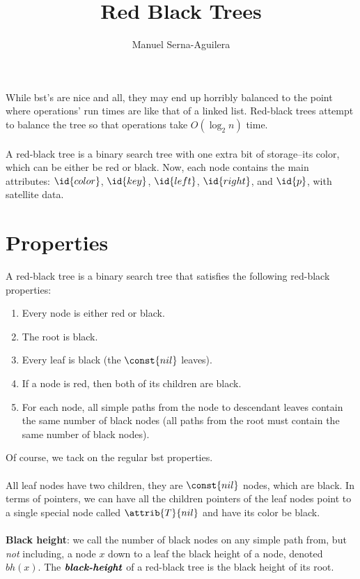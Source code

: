 \documentclass{article}
\title{Red Black Trees}
\author{Manuel Serna-Aguilera}
\date{}
\begin{document}
\maketitle

While bst's are nice and all, they may end up horribly balanced to the point where operations' run times are like that of a linked list. Red-black trees attempt to balance the tree so that operations take $O(\log_2{n})$ time.
\\ \\
A red-black tree is a binary search tree with one extra bit of storage--its color, which can be either be red or black. Now, each node contains the main attributes: $\id{color}$, $\id{key}$, $\id{left}$, $\id{right}$, and $\id{p}$, with satellite data.

\section*{Properties}
A red-black tree is a binary search tree that satisfies the following red-black properties:
\begin{enumerate}
    \item Every node is either red or black.
    \item The root is black.
    \item Every leaf is black (the $\const{nil}$ leaves).
    \item If a node is red, then both of its children are black.
    \item For each node, all simple paths from the node to descendant leaves contain the same number of black nodes (all paths from the root must contain the same number of black nodes).
\end{enumerate}
Of course, we tack on the regular bst properties.
\\ \\
All leaf nodes have two children, they are $\const{nil}$ nodes, which are black. In terms of pointers, we can have all the children pointers of the leaf nodes point to a single special node called $\attrib{T}{nil}$ and have its color be black.
\\ \\
\textbf{Black height}: we call the number of black nodes on any simple path from, but \textit{not} including, a node $x$ down to a leaf the black height of a node, denoted $bh(x)$. The $\textbf{\emph{black-height}}$ of a red-black tree is the black height of its root.

\newtheorem*{lemma}{Lemma}
\end{document}
